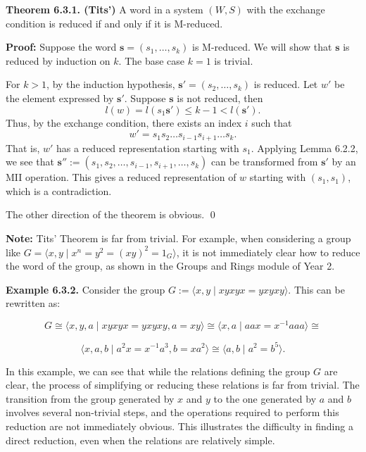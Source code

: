 \documentclass[../main.tex]{subfiles}
\begin{document}
\noindent \textbf{Theorem 6.3.1. (Tits')} A word in a system $(W, S)$ with the exchange condition is reduced if and only if it is M-reduced.

\vspace{0.5\baselineskip}

\noindent \textbf{Proof:} Suppose the word \( \mathbf{s} = (s_1, \dots, s_k) \) is M-reduced. We will show that \( \mathbf{s} \) is reduced by induction on \( k \). The base case \( k = 1 \) is trivial.

For \( k > 1 \), by the induction hypothesis, \( \mathbf{s'} = (s_2, \dots, s_k) \) is reduced. Let \( w' \) be the element expressed by \( \mathbf{s'} \). Suppose \( \mathbf{s} \) is not reduced, then
\[
l(w) = l(s_1 \mathbf{s'}) \leq k - 1 < l(\mathbf{s'}).
\]
Thus, by the exchange condition, there exists an index \( i \) such that 
\[
w' = s_1 s_2 \dots s_{i-1} s_{i+1} \dots s_k.
\]
That is, \( w' \) has a reduced representation starting with \( s_1 \). Applying Lemma 6.2.2, we see that \( \mathbf{s''} := (s_1, s_2, \dots, s_{i-1}, s_{i+1}, \dots, s_k) \) can be transformed from \( \mathbf{s'} \) by an MII operation. This gives a reduced representation of \( w \) starting with \( (s_1, s_1) \), which is a contradiction.

The other direction of the theorem is obvious. \qed

\vspace{\baselineskip}
\noindent \textbf{Note:} Tits' Theorem is far from trivial. For example, when considering a group like \( G = \langle x, y \mid x^n = y^2 = (xy)^2 = 1_G \rangle \), it is not immediately clear how to reduce the word of the group, as shown in the Groups and Rings module of Year 2.

\vspace{\baselineskip}
\noindent \textbf{Example 6.3.2.} Consider the group \( G := \langle x, y \mid xyxyx = yxyxy \rangle \). This can be rewritten as:

\[
G \cong \langle x, y, a \mid xyxyx = yxyxy, a = xy \rangle \cong \langle x, a \mid aax = x^{-1} aaa \rangle \cong \]

\[
\langle x, a, b \mid a^2x = x^{-1}a^3, b = xa^2 \rangle \cong \langle a, b \mid a^2 = b^5 \rangle.
\]

In this example, we can see that while the relations defining the group \( G \) are clear, the process of simplifying or reducing these relations is far from trivial. The transition from the group generated by \( x \) and \( y \) to the one generated by \( a \) and \( b \) involves several non-trivial steps, and the operations required to perform this reduction are not immediately obvious. This illustrates the difficulty in finding a direct reduction, even when the relations are relatively simple.
\end{document}

